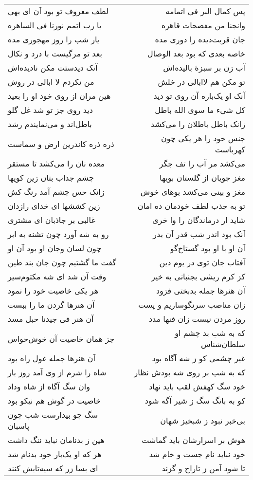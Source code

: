 \begin{center}
\begin{longtable}{l p{0.5cm} r}
لطف معروف تو بود آن ای بهی
&&
پس کمال البر فی اتمامه
\\
یا رب اتمم نورنا فی الساهره
&&
وانجنا من مفضحات قاهره
\\
یار شب را روز مهجوری مده
&&
جان قربت‌دیده را دوری مده
\\
بعد تو مرگیست با درد و نکال
&&
خاصه بعدی که بود بعد الوصال
\\
آنک دیدستت مکن نادیده‌اش
&&
آب زن بر سبزهٔ بالیده‌اش
\\
من نکردم لا ابالی در روش
&&
تو مکن هم لاابالی در خلش
\\
هین مران از روی خود او را بعید
&&
آنک او یک‌باره آن روی تو دید
\\
دید روی جز تو شد غل گلو
&&
کل شیء ما سوی الله باطل
\\
باطل‌اند و می‌نمایندم رشد
&&
زانک باطل باطلان را می‌کشد
\\
ذره ذره کاندرین ارض و سماست
&&
جنس خود را هر یکی چون کهرباست
\\
معده نان را می‌کشد تا مستقر
&&
می‌کشد مر آب را تف جگر
\\
چشم جذاب بتان زین کویها
&&
مغز جویان از گلستان بویها
\\
زانک حس چشم آمد رنگ کش
&&
مغز و بینی می‌کشد بوهای خوش
\\
زین کششها ای خدای رازدان
&&
تو به جذب لطف خودمان ده امان
\\
غالبی بر جاذبان ای مشتری
&&
شاید ار درماندگان را وا خری
\\
رو به شه آورد چون تشنه به ابر
&&
آنک بود اندر شب قدر آن بدر
\\
چون لسان وجان او بود آن او
&&
آن او با او بود گستاخ‌گو
\\
گفت ما گشتیم چون جان بند طین
&&
آفتاب جان توی در یوم دین
\\
وقت آن شد ای شه مکتوم‌سیر
&&
کز کرم ریشی بجنبانی به خیر
\\
هر یکی خاصیت خود را نمود
&&
آن هنرها جمله بدبختی فزود
\\
آن هنرها گردن ما را ببست
&&
زان مناصب سرنگوساریم و پست
\\
آن هنر فی جیدنا حبل مسد
&&
روز مردن نیست زان فنها مدد
\\
جز همان خاصیت آن خوش‌حواس
&&
که به شب بد چشم او سلطان‌شناس
\\
آن هنرها جمله غول راه بود
&&
غیر چشمی کو ز شه آگاه بود
\\
شاه را شرم از وی آمد روز بار
&&
که به شب بر روی شه بودش نظار
\\
وان سگ آگاه از شاه وداد
&&
خود سگ کهفش لقب باید نهاد
\\
خاصیت در گوش هم نیکو بود
&&
کو به بانگ سگ ز شیر آگه شود
\\
سگ چو بیدارست شب چون پاسبان
&&
بی‌خبر نبود ز شبخیز شهان
\\
هین ز بدنامان نباید ننگ داشت
&&
هوش بر اسرارشان باید گماشت
\\
هر که او یک‌بار خود بدنام شد
&&
خود نباید نام جست و خام شد
\\
ای بسا زر که سیه‌تابش کنند
&&
تا شود آمن ز تاراج و گزند
\\
\end{longtable}
\end{center}
